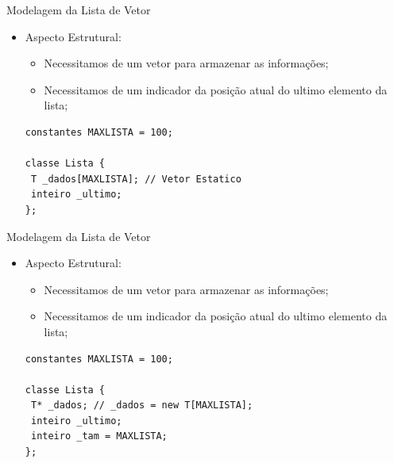 \documentclass[12pt,table,xcolor={dvipsnames}]{beamer}
\begin{document}
\begin{frame}[fragile]{Modelagem da Lista de Vetor}

\begin{itemize}
\item Aspecto Estrutural:
\begin{itemize}
\item Necessitamos de um vetor para armazenar as informações;
\item Necessitamos de um indicador da posição atual do ultimo elemento da lista;
\end{itemize}
\begin{lstlisting}
constantes MAXLISTA = 100;

classe Lista {
 T _dados[MAXLISTA]; // Vetor Estatico
 inteiro _ultimo;
};
\end{lstlisting}
\end{itemize}
\end{frame}

\begin{frame}[fragile]{Modelagem da Lista de Vetor}

\begin{itemize}
\item Aspecto Estrutural:
\begin{itemize}
\item Necessitamos de um vetor para armazenar as informações;
\item Necessitamos de um indicador da posição atual do ultimo elemento da lista;
\end{itemize}
\begin{lstlisting}
constantes MAXLISTA = 100;

classe Lista {
 T* _dados; // _dados = new T[MAXLISTA];
 inteiro _ultimo;
 inteiro _tam = MAXLISTA;
};
\end{lstlisting}
\end{itemize}
\end{frame}
\end{document}
